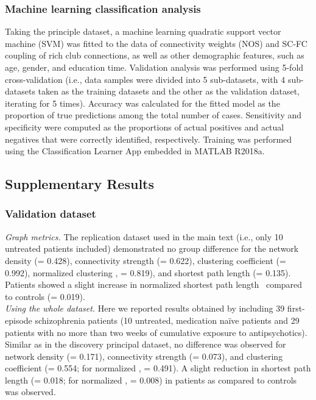 \begin{refsection}
\subsubsection*{Machine learning classification analysis}
Taking the principle dataset, a machine learning quadratic support vector machine (SVM) was fitted to the data of connectivity weights (NOS) and SC-FC coupling of rich club connections, as well as other demographic features, such as age, gender, and education time. Validation analysis was performed using 5-fold cross-validation (i.e., data samples were divided into 5 sub-datasets, with 4 sub-datasets taken as the training datasets and the other as the validation dataset, iterating for 5 times). Accuracy was calculated for the fitted model as the proportion of true predictions among the total number of cases. Sensitivity and specificity were computed as the proportions of actual positives and actual negatives that were correctly identified, respectively. Training was performed using the Classification Learner App embedded in MATLAB R2018a.

\subsection*{Supplementary Results}
\subsubsection*{Validation dataset}
\textit{Graph metrics.} The replication dataset used in the main text (i.e., only 10 untreated patients included) demonstrated no group difference for the network density (\pval = 0.428), connectivity strength (\pval = 0.622), clustering coefficient (\pval = 0.992), normalized clustering \textgamma, \pval = 0.819), and shortest path length (\pval = 0.135). Patients showed a slight increase in normalized shortest path length \textlambda \ compared to controls (\pval = 0.019).\\

\noindent
\textit{Using the whole dataset.} Here we reported results obtained by including 39 first-episode schizophrenia patients (10 untreated, medication na\"{i}ve patients and 29 patients with no more than two weeks of cumulative exposure to antipsychotics). Similar as in the discovery principal dataset, no difference was observed for network density (\pval = 0.171), connectivity strength (\pval = 0.073), and clustering coefficient (\pval = 0.554; for normalized \textgamma, \pval = 0.491). A slight reduction in shortest path length (\pval = 0.018; for normalized \textlambda, \pval = 0.008) in patients as compared to controls was observed.


\end{refsection}
